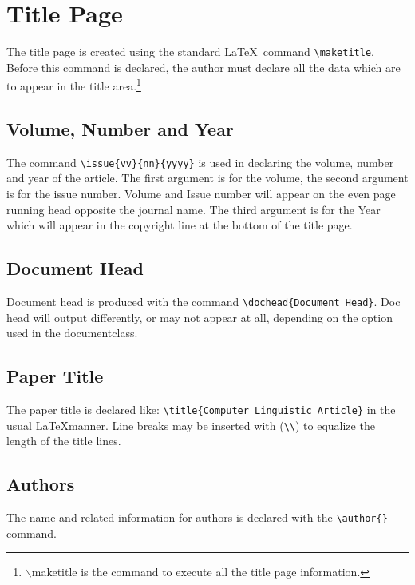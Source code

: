 \section{Title Page}

The title page is created using the standard \LaTeX\ command \verb|\maketitle|. 
Before this command is declared, the author must declare all the data which are to appear in the title area.\footnote{$\backslash$maketitle is the command to execute all the title page information.}

\subsection{Volume, Number and Year}

The command \verb|\issue{vv}{nn}{yyyy}| is used in declaring the volume, number and year of the article. The first argument is for the volume, the second argument is for the issue number. Volume and Issue number will appear on the even page running head opposite the journal name. The third argument is for the Year which will appear in the copyright line at the bottom of the title page.

\subsection{Document Head}

Document head is produced with the command \verb|\dochead{Document Head}|. Doc head will output differently, or may not appear at all, depending on the option used in the documentclass.

\subsection{Paper Title}

The paper title is declared like: \verb|\title{Computer Linguistic Article}| in the usual \LaTeX manner. Line breaks may be inserted with (\verb|\\|) to equalize the length of the title lines.

\subsection{Authors}
The name and related information for authors is declared with the \verb|\author{}| command. 

